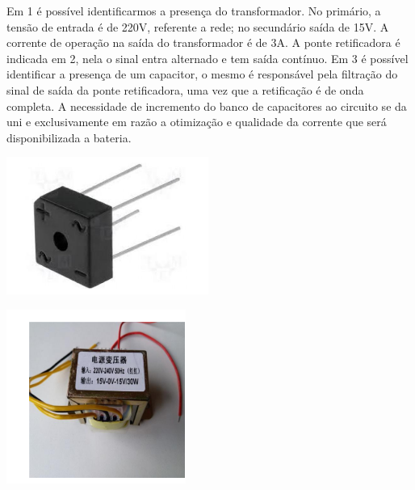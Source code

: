 Em 1 é possível identificarmos a presença do transformador. No primário, a tensão de entrada é de 220V, referente a rede; no secundário saída de 15V. A corrente de operação na saída do transformador é de 3A. A ponte retificadora é indicada em 2, nela o sinal entra alternado e tem saída contínuo. Em 3 é possível identificar a presença de um capacitor, o mesmo é responsável pela filtração do sinal de saída da ponte retificadora, uma vez que a retificação é de onda completa. A necessidade de incremento do banco de capacitores ao circuito se da uni e exclusivamente em razão a otimização e qualidade da corrente que será disponibilizada a bateria. 
                                                   
                               \begin{center}
    	\includegraphics[scale=0.7]{figuras/bateria}
        \label{bateria}
    \end{center}
                                             
 \begin{center}
    	\includegraphics[scale=0.7]{figuras/trafo}
        \label{trafo}
    \end{center}
                            
